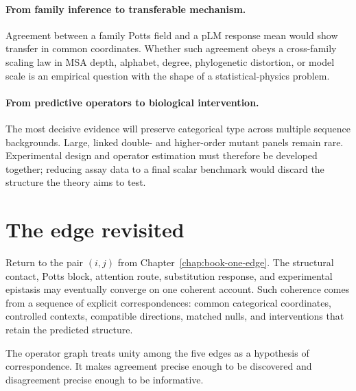 \paragraph{From family inference to transferable mechanism.}
Agreement between a family Potts field and a pLM response mean would show transfer in common
coordinates.  Whether such agreement obeys a cross-family scaling law in MSA depth, alphabet,
degree, phylogenetic distortion, or model scale is an empirical question with the shape of a
statistical-physics problem.

\paragraph{From predictive operators to biological intervention.}
The most decisive evidence will preserve categorical type across multiple sequence backgrounds.
Large, linked double- and higher-order mutant panels remain rare.  Experimental design and operator
estimation must therefore be developed together; reducing assay data to a final scalar benchmark
would discard the structure the theory aims to test.

\section{The edge revisited}

Return to the pair $(i,j)$ from Chapter~\ref{chap:book-one-edge}.  The structural contact, Potts block,
attention route, substitution response, and experimental epistasis may eventually converge on one
coherent account.  Such coherence comes from a sequence of explicit correspondences: common categorical coordinates,
controlled contexts, compatible directions, matched nulls, and interventions that retain the
predicted structure.

The operator graph treats unity among the five edges as a hypothesis of correspondence.  It makes
agreement precise enough to be discovered and disagreement precise enough to be informative.
